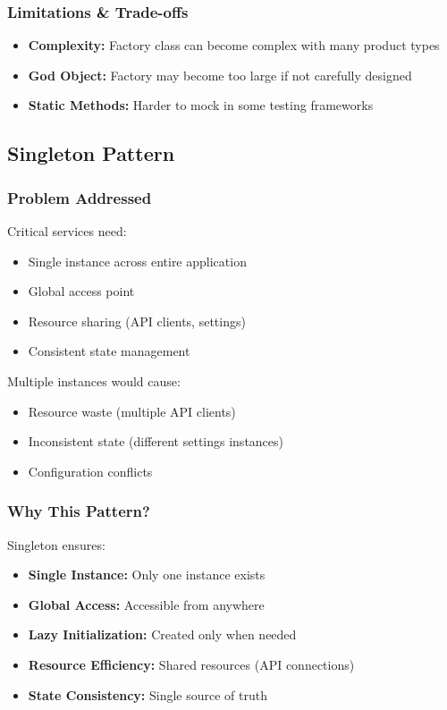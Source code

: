 \documentclass[11pt, a4paper]{article}
\theoremstyle{plain}
\theoremstyle{definition}
\begin{document}
\subsubsection{Limitations \& Trade-offs}

\begin{itemize}
    \item \textbf{Complexity:} Factory class can become complex with many product types
    \item \textbf{God Object:} Factory may become too large if not carefully designed
    \item \textbf{Static Methods:} Harder to mock in some testing frameworks
\end{itemize}

\subsection{Singleton Pattern}

\subsubsection{Problem Addressed}

Critical services need:
\begin{itemize}
    \item Single instance across entire application
    \item Global access point
    \item Resource sharing (API clients, settings)
    \item Consistent state management
\end{itemize}

Multiple instances would cause:
\begin{itemize}
    \item Resource waste (multiple API clients)
    \item Inconsistent state (different settings instances)
    \item Configuration conflicts
\end{itemize}

\subsubsection{Why This Pattern?}

Singleton ensures:
\begin{itemize}
    \item \textbf{Single Instance:} Only one instance exists
    \item \textbf{Global Access:} Accessible from anywhere
    \item \textbf{Lazy Initialization:} Created only when needed
    \item \textbf{Resource Efficiency:} Shared resources (API connections)
    \item \textbf{State Consistency:} Single source of truth
\end{itemize}
\end{document}
